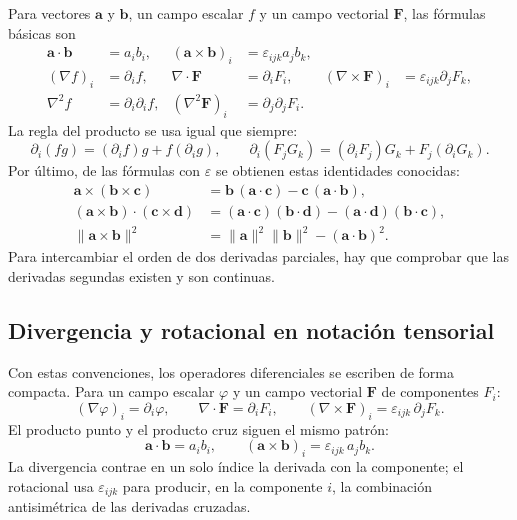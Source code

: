 Para vectores $\mathbf{a}$ y $\mathbf{b}$, un campo escalar $f$ y un campo vectorial $\mathbf{F}$, las fórmulas básicas son
\begin{align*}
\mathbf{a}\cdot\mathbf{b}&=a_i b_i,
&
(\mathbf{a}\times\mathbf{b})_i&=\varepsilon_{ijk}a_jb_k,\\
(\nabla f)_i&=\partial_i f,
&
\nabla\cdot\mathbf{F}&=\partial_iF_i,
&
(\nabla\times\mathbf{F})_i&=\varepsilon_{ijk}\partial_jF_k,\\
\nabla^2f&=\partial_i\partial_i f,
&
(\nabla^2\mathbf{F})_i&=\partial_j\partial_jF_i.
\end{align*}
La regla del producto se usa igual que siempre:
\[
\partial_i(fg)=(\partial_i f)g+f(\partial_i g),
\qquad
\partial_i(F_jG_k)=(\partial_iF_j)G_k+F_j(\partial_iG_k).
\]
Por último, de las fórmulas con $\varepsilon$ se obtienen estas identidades conocidas:
\begin{align*}
\mathbf{a}\times(\mathbf{b}\times\mathbf{c})
  &=\mathbf{b}\,(\mathbf{a}\cdot\mathbf{c})-\mathbf{c}\,(\mathbf{a}\cdot\mathbf{b}),\\
(\mathbf{a}\times\mathbf{b})\cdot(\mathbf{c}\times\mathbf{d})
  &=(\mathbf{a}\cdot\mathbf{c})(\mathbf{b}\cdot\mathbf{d})
    -(\mathbf{a}\cdot\mathbf{d})(\mathbf{b}\cdot\mathbf{c}),\\
\|\mathbf{a}\times\mathbf{b}\|^2
  &=\|\mathbf{a}\|^2\|\mathbf{b}\|^2-(\mathbf{a}\cdot\mathbf{b})^2.
\end{align*}
Para intercambiar el orden de dos derivadas parciales, hay que comprobar que las derivadas segundas existen y son continuas.

\subsection{Divergencia y rotacional en notación tensorial}

Con estas convenciones, los operadores diferenciales se escriben de forma compacta. Para un campo escalar $\varphi$ y un campo vectorial $\mathbf{F}$ de componentes $F_i$:
\[
(\nabla \varphi)_i = \partial_i \varphi,
\qquad
\nabla \cdot \mathbf{F} = \partial_i F_i,
\qquad
(\nabla \times \mathbf{F})_i = \varepsilon_{ijk}\, \partial_j F_k.
\]
El producto punto y el producto cruz siguen el mismo patrón:
\[
\mathbf{a} \cdot \mathbf{b} = a_i b_i,
\qquad
(\mathbf{a} \times \mathbf{b})_i = \varepsilon_{ijk}\, a_j b_k.
\]
La divergencia contrae en un solo índice la derivada con la componente; el rotacional usa $\varepsilon_{ijk}$ para producir, en la componente $i$, la combinación antisimétrica de las derivadas cruzadas.

